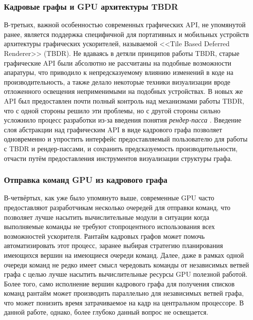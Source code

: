 \subsubsection{Кадровые графы и GPU архитектуры TBDR}
В-третьих, важной особенностью современных графических API, не упомянутой ранее, является поддержка специфичной для портативных и мобильных устройств архитектуры графических ускорителей, называемой <<Tile Based Deferred Renderer>> (TBDR).
Не вдаваясь в детяли принципов работы TBDR, старые графические API были абсолютно не рассчитаны на подобные возможности апаратуры, что приводило к непредсказуемому влиянию изменений в коде на производительность, а также делало некоторые техники визуализации вроде отложенного освещения неприменимыми на подобных устройствах.
В новых же API был предоставлен почти полный контроль над механизмами работы TBDR, что с одной стороны решило эти проблемы, но с другой стороны сильно усложнило процесс разработки из-за введения понятия \textit{рендер-пасса} \cite[раздел~8]{VulkanSpec}.
Введение слоя абстракции над графическим API в виде кадрового графа позволяет одновременно и упростить интерфейс предоставляемый пользователю для работы с TBDR и рендер-пассами, и сохранить предсказуемость производительности, отчасти путём предоставления инструментов визуализации структуры графа.

\subsubsection{Отправка команд GPU из кадрового графа}
В-четвёртых, как уже было упомянуто выше, современные GPU часто предоставляют разработчикам несколько очередей для отправки команд, что позволяет лучше насытить вычислительные модули в ситуации когда выполняемые команды не требуют стопроцентного использования всех возможностей ускорителя.
Рантайм кадровых графов может помочь автоматизировать этот процесс, заранее выбирая стратегию планирования имеющихся вершин на имеющиеся очереди команд.
Далее, даже в рамках одной очереди команд не редко имеет смысл чередовать команды от независимых ветвей графа с целью лучше насытить вычислительные ресурсы GPU полезной работой.
Более того, само исполнение вершин кадрового графа для получения списков команд рантайм может производить параллельно для независимых ветвей графа, что может понизить время затрачиваемое на кадр на центральном процессоре.
В данной работе, однако, более глубоко данный вопрос не освещается.

